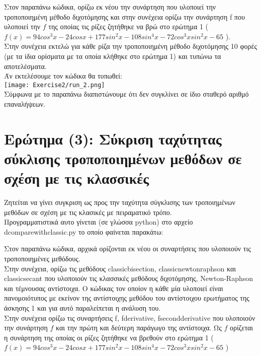 \documentclass[a4paper,11pt]{article}
\newcommand{\lt}{\latintext}
\newcommand{\gt}{\greektext}
\begin{document}
Στον παραπάνω κώδικα, ορίζω εκ νέου την συνάρτηση που υλοποιεί την τροποποιημένη μέθοδο διχοτόμησης και στην συνέχεια ορίζω την συνάρτηση {\lt f} που υλοποιεί την $f$ της οποίας τις ρίζες ζητήθηκε να βρώ στο ερώτημα 1 (\lt $f(x) = 94cos^3x - 24cosx + 177sin^2x - 108sin^4x - 72cos^3xsin^2x -65$ \gt).\\
Στην συνέχεια εκτελώ για κάθε ρίζα την τροποποιημένη μέθοδο διχοτόμησης 10 φορές (με τα ίδια ορίσματα με τα οποία κλήθηκε στο ερώτημα 1) και τυπώνω τα αποτελέσματα.\\

Άν εκτελέσουμε τον κώδικα θα τυπωθεί:\\
\texttt{[image: Exercise2/run\_2.png]}\\

Σύμφωνα με το παραπάνω διαπιστώνουμε ότι δεν συγκλίνει σε ίδιο σταθερό αριθμό επαναλήψεων.

\section{Ερώτημα (3): Σύκριση ταχύτητας σύκλισης τροποποιημένων μεθόδων σε σχέση με τις κλασσικές}
Ζητείται να γίνει συγκριση ως προς την ταχύτητα σύγκλισης των τροποιημένων μεθόδων σε
σχέση με τις κλασικές με πειραματικό τρόπο.\\

Προγραμματιστικά αυτο γίνεται (σε γλώσσα {\lt python}) στο αρχείο {\lt d\textunderscore compare\textunderscore with\textunderscore classic.py} το οποίο φαίνεται παρακάτω:\\
\lt

\gt

Στον παραπάνω κώδικα, αρχικά ορίζονται εκ νέου οι  συναρτήσεις που υλοποιούν τις τροποποιημένες μεθόδους.\\
Στην συνέχεια, ορίζω τις μεθόδους {\lt classic\textunderscore bisection}, {\lt classic\textunderscore newton\textunderscore raphson} και {\lt classic\textunderscore secant} που υλοποιούν τις κλασσικές μεθόδους διχοτόμησης, {\lt Newton-Raphson} και τέμνουσας αντίστοιχα. Ο κώδικας τον οποίον η κάθε μία υλοποιεί είναι πανομοιότυπος με εκείνον της αντίστοιχης μεθόδου του αντίστοιχου ερωτήματος της άσκησης 1 και για αυτό παραλείπεται η ανάλυση του.\\
Στην συνέχεια ορίζω τις συναρτήσεις {\lt f, f\textunderscore derivative, f\textunderscore second\textunderscore derivative} που υλοποιούν την συνάρτηση $f$ και την πρώτη και δεύτερη παράγωγο της αντίστοιχα. Ως $f$ ορίζεται η συνάρτηση της οποίας οι ρίζες ζητήθηκε να βρεθούν στο ερώτημα 1 (\lt $f(x) = 94cos^3x - 24cosx + 177sin^2x - 108sin^4x - 72cos^3xsin^2x -65$ \gt)\\
\end{document}
